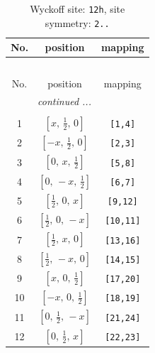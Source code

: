 \documentclass[fleqn,8pt]{jsarticle}
\begin{document}
\begin{longtable}{ccc}
\caption{Wyckoff site: {\tt 12h}, site symmetry: {\tt 2..}}
 \\
 \hline \hline
No. & position & mapping \\ \hline \endfirsthead

\multicolumn{2}{l}{\tablename\ \thetable{}} \\
 \hline \hline
No. & position & mapping \\ \hline \endhead

 \hline \hline
\multicolumn{2}{r}{\footnotesize\it continued ...} \\ \endfoot

 \hline \hline
\multicolumn{2}{r}{} \\ \endlastfoot

1 & $\left[ x,\, \frac{1}{2},\, 0 \right]$ & {\tt [1,4]} \\ \hline
2 & $\left[ - x,\, \frac{1}{2},\, 0 \right]$ & {\tt [2,3]} \\ \hline
3 & $\left[ 0,\, x,\, \frac{1}{2} \right]$ & {\tt [5,8]} \\ \hline
4 & $\left[ 0,\, - x,\, \frac{1}{2} \right]$ & {\tt [6,7]} \\ \hline
5 & $\left[ \frac{1}{2},\, 0,\, x \right]$ & {\tt [9,12]} \\ \hline
6 & $\left[ \frac{1}{2},\, 0,\, - x \right]$ & {\tt [10,11]} \\ \hline
7 & $\left[ \frac{1}{2},\, x,\, 0 \right]$ & {\tt [13,16]} \\ \hline
8 & $\left[ \frac{1}{2},\, - x,\, 0 \right]$ & {\tt [14,15]} \\ \hline
9 & $\left[ x,\, 0,\, \frac{1}{2} \right]$ & {\tt [17,20]} \\ \hline
10 & $\left[ - x,\, 0,\, \frac{1}{2} \right]$ & {\tt [18,19]} \\ \hline
11 & $\left[ 0,\, \frac{1}{2},\, - x \right]$ & {\tt [21,24]} \\ \hline
12 & $\left[ 0,\, \frac{1}{2},\, x \right]$ & {\tt [22,23]} \\
\end{longtable}
\renewcommand{\arraystretch}{1.2}
\end{document}
